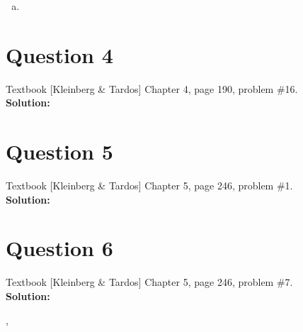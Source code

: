 \documentclass[11pt]{article}
\begin{document}
\begin{enumerate}[(a)]
\begin{enumerate}[(1)]
\end{enumerate}

\item 
\end{enumerate}

\clearpage
\section{Question 4} Textbook [Kleinberg \& Tardos] Chapter 4, page 190, problem \#16. \\
\textbf{Solution:} \\

\clearpage
\section{Question 5} Textbook [Kleinberg \& Tardos] Chapter 5, page 246, problem \#1. \\
\textbf{Solution:} \\

\clearpage
\section{Question 6} Textbook [Kleinberg \& Tardos] Chapter 5, page 246, problem \#7. \\
\textbf{Solution:} \\

\clearpage

\begin{thebibliography}{9}
	\bibitem{} 
	,
	\\\texttt{}
	
\end{thebibliography}
\end{document}
